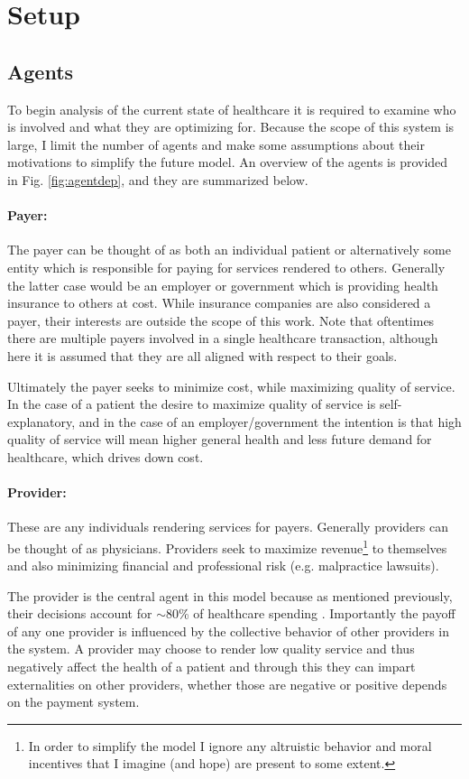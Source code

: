 \documentclass{article}
\begin{document}
\section{Setup}

\subsection{Agents}
To begin analysis of the current state of healthcare it is required to examine who is involved and what they are optimizing for. Because the scope of this system is large, I limit the number of agents and make some assumptions about their motivations to simplify the future model. An overview of the agents is provided in Fig. \ref{fig:agentdep}, and they are summarized below.

\paragraph{Payer:}The payer can be thought of as both an individual patient or alternatively some entity which is responsible for paying for services rendered to others. Generally the latter case would be an employer or government which is providing health insurance to others at cost. While insurance companies are also considered a payer, their interests are outside the scope of this work. Note that oftentimes there are multiple payers involved in a single healthcare transaction, although here it is assumed that they are all aligned with respect to their goals.

Ultimately the payer seeks to minimize cost, while maximizing quality of service. In the case of a patient the desire to maximize quality of service is self-explanatory, and in the case of an employer/government the intention is that high quality of service will mean higher general health and less future demand for healthcare, which drives down cost.

\paragraph{Provider:}These are any individuals rendering services for payers. Generally providers can be thought of as physicians. Providers seek to maximize revenue\footnote{In order to simplify the model I ignore any altruistic behavior and moral incentives that I imagine (and hope) are present to some extent.} to themselves and also minimizing financial and professional risk (e.g. malpractice lawsuits).

The provider is the central agent in this model because as mentioned previously, their decisions account for ${\sim}80$\% of healthcare spending \cite{trust}. Importantly the payoff of any one provider is influenced by the collective behavior of other providers in the system. A provider may choose to render low quality service and thus negatively affect the health of a patient and through this they can impart externalities on other providers, whether those are negative or positive depends on the payment system.
\end{document}
